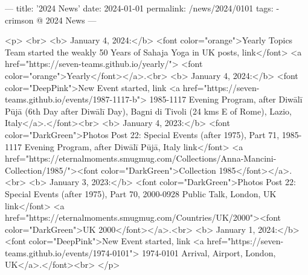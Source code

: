 ---
title: '2024 News'
date: 2024-01-01
permalink: /news/2024/0101
tags:
  - crimson @ 2024 News
---

<p>
<br>
<b> January 4, 2024:</b> <font color="orange">Yearly Topics Team started the weakly 50 Years of Sahaja Yoga in UK posts, link</font> <a href="https://seven-teams.github.io/yearly/"> <font color="orange">Yearly</font></a>.<br>
<b> January 4, 2024:</b> <font color="DeepPink">New Event started, link <a href="https://seven-teams.github.io/events/1987-1117-b"> 1985-1117 Evening Program, after Diwālī Pūjā (6th Day after Diwālī Day), Bagni di Tivoli (24 kms E of Rome), Lazio, Italy</a>.</font><br>
<b> January 4, 2023:</b> <font color="DarkGreen">Photos Post 22: Special Events (after 1975), Part 71, 1985-1117 Evening Program, after Diwālī Pūjā, Italy link</font> <a href="https://eternalmoments.smugmug.com/Collections/Anna-Mancini-Collection/1985/"><font color="DarkGreen">Collection 1985</font></a>.<br>
<b> January 3, 2023:</b> <font color="DarkGreen">Photos Post 22: Special Events (after 1975), Part 70, 2000-0928 Public Talk, London, UK link</font> <a href="https://eternalmoments.smugmug.com/Countries/UK/2000"><font color="DarkGreen">UK 2000</font></a>.<br>
<b> January 1, 2024:</b> <font color="DeepPink">New Event started, link <a href="https://seven-teams.github.io/events/1974-0101"> 1974-0101 Arrival, Airport, London, UK</a>.</font><br>
</p>